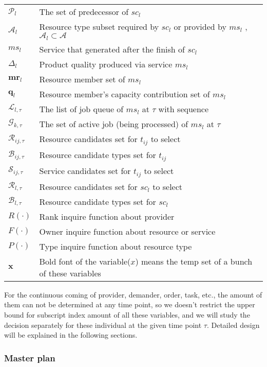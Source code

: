 \begin{table}[htbp]
\begin{tabularx}{\textwidth}{|lX|}
	$\mathcal{P}_{l}$ & The set of predecessor of $sc_{l}$\\
	$\mathcal{A}_l$ & Resource type subset required by $sc_l$ or provided by $ms_l$ , $\mathcal{A}_l\subset\mathcal{A}$\\
	$ms_l$ & Service that generated after the finish of $sc_l$\\
	$\Delta_l$ & Product quality produced via service $ms_l$\\
	$\bm{mr}_l$ & Resource member set of $ms_l$\\
	$\bm{q}_l$ & Resource member's capacity contribution set of $ms_l$\\
	$\mathcal{L}_{l,\tau}$ & The list of job queue of $ms_l$ at $\tau$ with sequence\\
	$\mathcal{G}_{k,\tau}$ & The set of active job (being processed) of $ms_l$ at $\tau$ \\
	$\mathcal{R}_{ij,\tau}$ & Resource candidates set for $t_{ij}$ to select\\
	$\mathcal{B}_{ij,\tau}$ & Resource candidate types set for $t_{ij}$\\
	$\mathcal{S}_{ij,\tau}$ & Service candidates set for $t_{ij}$ to select\\
	$\mathcal{R}_{l,\tau}$ & Resource candidates set for $sc_l$ to select\\
	$\mathcal{B}_{l,\tau}$ & Resource candidate types set for $sc_l$\\
	$R(\cdot)$ & Rank inquire function about provider\\
	$F(\cdot)$ & Owner inquire function about resource or service\\
	$P(\cdot)$ & Type inquire function about resource type\\
	$\bm{x}$ & Bold font of the variable($x$) means the temp set of a bunch of these variables\\
    \hline
\end{tabularx}
\end{table}

For the continuous coming of provider, demander, order, task, etc., the amount of them can not be determined at any time point, so we doesn't restrict the upper bound for subscript index amount of all these variables, and we will study the decision separately for these individual at the given time point $\tau$. Detailed design will be explained in the following sections.
\subsubsection{Master plan} %
\label{ssub:master_plam}


